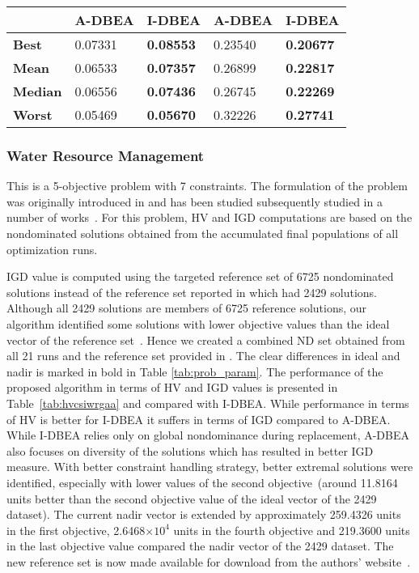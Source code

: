 \begin{table}[!htb]
\begin{tabular}{|l|l|l|l|l|}
		\textbf{}       & \textbf{A-DBEA}   & \textbf{I-DBEA}   & \textbf{A-DBEA}   & \textbf{I-DBEA}  \\ \hline
		\textbf{Best}   & 0.07331           & \textbf{0.08553}  & 0.23540           & \textbf{0.20677} \\ \hline
		\textbf{Mean}   & 0.06533           & \textbf{0.07357}  & 0.26899           & \textbf{0.22817} \\ \hline
		\textbf{Median} & 0.06556           & \textbf{0.07436}  & 0.26745           & \textbf{0.22269} \\ \hline
		\textbf{Worst}  & 0.05469           & \textbf{0.05670}  & 0.32226           & \textbf{0.27741} \\ \hline
	\end{tabular}
\end{table}

\subsubsection{Water Resource Management}

This is a 5-objective problem with 7 constraints. The formulation of the problem was originally introduced in \cite{musselman1980water} and has been studied subsequently studied in a number of works~\cite{Ray2001,asaf2012manyeps,Asafmany2015}.  For this problem, HV and IGD computations are based on the nondominated solutions obtained from the accumulated final populations of all optimization runs.

IGD value is computed using the targeted reference set of 6725 nondominated solutions instead of the reference set reported in \cite{durillo2011jmetal} which had  2429 solutions. Although all 2429 solutions are members of 6725 reference solutions, our algorithm identified some solutions with lower objective values than the ideal vector of the reference set~\cite{durillo2011jmetal}. Hence we created a combined ND set obtained from all 21 runs and the reference set provided in \cite{durillo2011jmetal}. The clear differences in ideal and nadir is marked in bold in Table \ref{tab:prob_param}. The performance of the proposed algorithm in terms of HV and IGD values is presented in Table~\ref{tab:hvcsiwrgaa} and compared with I-DBEA. While performance in terms of HV is better for I-DBEA it suffers in terms of IGD compared to A-DBEA. While I-DBEA relies only on global nondominance during replacement, A-DBEA also focuses on diversity of the solutions which has resulted in better IGD measure. With better constraint handling strategy, better extremal solutions were identified, especially with lower values of the second objective~(around 11.8164 units better than the second objective value of the ideal vector of the 2429 dataset). The current nadir vector is extended by approximately 259.4326 units in the first objective, 2.6468$\times 10^4$ units in the fourth objective and 219.3600 units in the last objective value compared the nadir vector of the 2429 dataset. The new reference set is now made available for download from the authors' website~\cite{mdo2017adbea}. 


